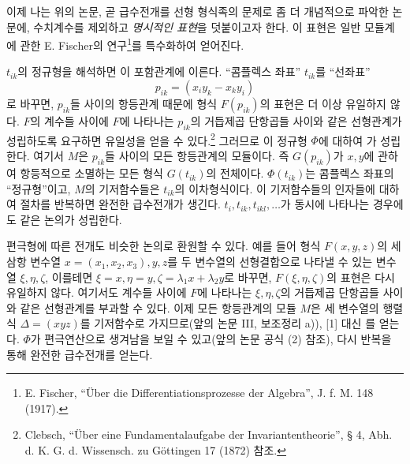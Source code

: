 이제 나는 위의 논문, 곧 급수전개를 선형 형식족의 문제로 좀 더 개념적으로 파악한 논문에, 수치계수를 제외하고 \emph{명시적인 표현}을 덧붙이고자 한다. 이 표현은 일반 모듈계에 관한 E. Fischer의 연구\footnote{E. Fischer, ``Über die Differentiationsprozesse der Algebra'', J. f. M. 148 (1917).}를 특수화하여 얻어진다.

\(t_{ik}\)의 정규형을 해석하면 이 포함관계에 이른다. ``콤플렉스 좌표'' \(t_{ik}\)를 ``선좌표''
\[
p_{ik}=(x_i y_k-x_k y_i)
\]
로 바꾸면, \(p_{ik}\)들 사이의 항등관계 때문에 형식 \(F(p_{ik})\)의 표현은 더 이상 유일하지 않다. \(F\)의 계수들 사이에 \(F\)에 나타나는 \(p_{ik}\)의 거듭제곱 단항곱들 사이와 같은 선형관계가 성립하도록 요구하면 유일성을 얻을 수 있다.\footnote{Clebsch, ``Über eine Fundamentalaufgabe der Invariantentheorie'', § 4, Abh. d. K. G. d. Wissensch. zu Göttingen 17 (1872) 참조.} 그러므로 이 정규형 \(\Phi\)에 대하여
가 성립한다. 여기서 \(M\)은 \(p_{ik}\)들 사이의 모든 항등관계의 모듈이다. 즉 \(G(p_{ik})\)가 \(x,y\)에 관하여 항등적으로 소멸하는 모든 형식 \(G(t_{ik})\)의 전체이다. \(\Phi(t_{ik})\)는 콤플렉스 좌표의 ``정규형''이고, \(M\)의 기저함수들은 \(t_{ik}\)의 이차형식이다. 이 기저함수들의 인자들에 대하여 절차를 반복하면 완전한 급수전개가 생긴다. \(t_i,t_{ik},t_{ikl},\ldots\)가 동시에 나타나는 경우에도 같은 논의가 성립한다.

편극형에 따른 전개도 비슷한 논의로 환원할 수 있다. 예를 들어 형식 \(F(x,y,z)\)의 세 삼항 변수열 \(x=(x_1,x_2,x_3),y,z\)를 두 변수열의 선형결합으로 나타낼 수 있는 변수열 \(\xi,\eta,\zeta\), 이를테면 \(\xi=x,\eta=y,\zeta=\lambda_1x+\lambda_2y\)로 바꾸면, \(F(\xi,\eta,\zeta)\)의 표현은 다시 유일하지 않다. 여기서도 계수들 사이에 \(F\)에 나타나는 \(\xi,\eta,\zeta\)의 거듭제곱 단항곱들 사이와 같은 선형관계를 부과할 수 있다. 이제 모든 항등관계의 모듈 \(M\)은 세 변수열의 행렬식 \(\Delta=(xyz)\)를 기저함수로 가지므로(앞의 논문 III, 보조정리 a)), [1] 대신
를 얻는다. \(\Phi\)가 편극연산으로 생겨남을 보일 수 있고(앞의 논문 공식 (2) 참조), 다시 반복을 통해 완전한 급수전개를 얻는다.

